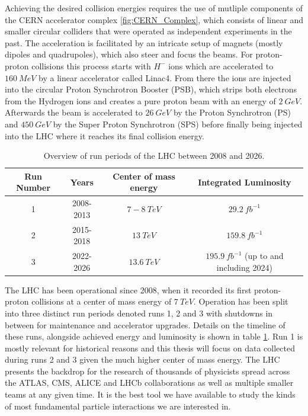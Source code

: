 Achieving the desired collision energies requires the use of mutliple components of the CERN accelerator complex 
\ref{fig:CERN_Complex}, which consists of linear and smaller circular colliders that were operated as independent 
experiments in the past. The acceleration is facilitated by an intricate setup of magnets (mostly dipoles and quadrupoles), 
which also steer and focus the beams. For proton-proton collisions this process starts with $H^-$ ions which are 
accelerated to $160\ MeV$ by a linear accelerator called Linac4. From there the ions are injected into the circular  
Proton Synchrotron Booster (PSB), which strips both electrons from the Hydrogen ions and creates a pure proton beam with 
an energy of $2\ GeV$. Afterwards the beam is accelerated to $26\ GeV$ by the Proton Synchrotron (PS) and $450\ GeV$ by the Super Proton Synchrotron (SPS) before finally being injected into the LHC where it reaches its final collision energy. 
\par

\begin{table}
\begin{center}
\caption{Overview of run periods of the LHC between 2008 and 2026.}
\label{table-lhc-runs}
\begin{tabular}{|c c c c|} 
 \hline
 Run Number & Years & Center of mass energy & Integrated Luminosity \\ [0.5ex] 
 \hline
 1 & 2008-2013 & $7-8\ TeV$ & $29.2\ fb^{-1}$ \\ 
 2 & 2015-2018 & $13\ TeV$ & $159.8\ fb^{-1}$ \\ 
 3 & 2022-2026 & $13.6\ TeV$ & $195.9\ fb^{-1}$ (up to and including 2024) \\ 
 \hline
\end{tabular}
\end{center}
\end{table}

The LHC has been operational since 2008, when it recorded its first proton-proton collisions at a center of mass energy 
of $7\ TeV$. Operation has been split into three distinct run periods denoted runs 1, 2 and 3 with shutdowns in 
between for maintenance and accelerator upgrades. Details on the timeline of these runs, alongside achieved energy and 
luminosity is shown in table \ref{table-lhc-runs}. Run 1 is mostly relevant for historical reasons and this thesis will 
focus on data collected during runs 2 and 3 given the much higher center of mass energy. The LHC presents the backdrop 
for the research of thousands of physicists spread across the ATLAS, CMS, ALICE and LHCb collaborations as well as 
multiple smaller teams at any given time. It is the best tool we have available to study the kinds of most fundamental 
particle interactions we are interested in.

